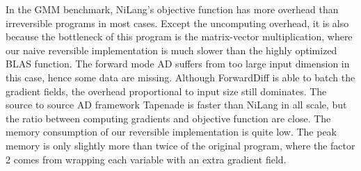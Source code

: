 \documentclass{article}
\newcommand{\<}{\langle}
\renewcommand{\>}{\rangle}
\newcommand{\ra}[1]{\renewcommand{\arraystretch}{#1}}
\theoremstyle{definition}\newtheorem{definition}{\textit{Definition}}
\begin{document}
In the GMM benchmark, NiLang's objective function has more overhead than irreversible programs in most cases.
Except the uncomputing overhead, it is also because the bottleneck of this program is the matrix-vector multiplication,
where our naive reversible implementation is much slower than the highly optimized BLAS function.
The forward mode AD suffers from too large input dimension in this case, hence some data are missing.
Although ForwardDiff is able to batch the gradient fields, the overhead proportional to input size still dominates.
The source to source AD framework Tapenade is faster than NiLang in all scale,
but the ratio between computing gradients and objective function are close.
The memory consumption of our reversible implementation is quite low.
The peak memory is only slightly more than twice of the original program,
where the factor 2 comes from wrapping each variable with an extra gradient field.

\begin{table}[h!]\centering
    \scriptsize
\begin{minipage}{\columnwidth}
\ra{1.3}
    \caption{Absolute runtimes in seconds for computing the objective (O) and Jacobians (J) in bundle adjustment.}\label{tbl:ba}
\end{minipage}
\end{table}
\end{document}
